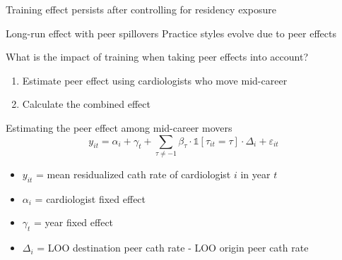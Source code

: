 \documentclass[10pt,aspectratio=169]{beamer}
\begin{document}
\begin{frame}[label=residency]{Training effect persists after controlling for residency exposure}
    \centering
    
    \vspace{1mm}
    \centering
    \hyperlink{residency-exact-name}{}
\end{frame}


\begin{frame}{Long-run effect with peer spillovers}
    Practice styles evolve due to peer effects \textcolor{gray}{\scriptsize\textcite{molitor2018}}
    
    \vspace{2.5mm}
    \hspace{30mm}{$\downarrow$}
    \vspace{2.5mm}

    What is the impact of training when taking peer effects into account?
    \begin{enumerate}
        \item Estimate peer effect using cardiologists who move mid-career
        \item Calculate the combined effect 
    \end{enumerate}
\end{frame}

\begin{frame}{Estimating the peer effect among mid-career movers}
    \begin{equation*}
        y_{it} = \alpha_i + \gamma_t + \sum_{\tau\neq-1}\beta_{\tau}\cdot\mathds{1}[\tau_{it} = \tau] \cdot \Delta_{i} + \varepsilon_{it}
    \end{equation*}
    \begin{itemize}
        \item $y_{it}$ = mean residualized cath rate of cardiologist $i$ in year $t$
        \item $\alpha_i$ = cardiologist fixed effect
        \item $\gamma_t$ = year fixed effect
        \item $\Delta_i$ = LOO destination peer cath rate - LOO origin peer cath rate
    \end{itemize}
\end{frame}
\end{document}
